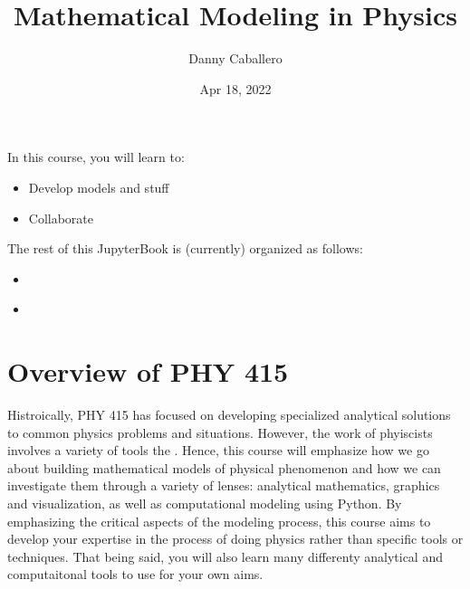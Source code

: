 \documentclass[letterpaper,10pt,english]{jupyterBook}
\title{Mathematical Modeling in Physics}
\date{Apr 18, 2022}
\author{Danny Caballero}
\begin{document}
\pagestyle{empty}
\sphinxmaketitle
\pagestyle{plain}
\sphinxtableofcontents
\pagestyle{normal}
\label{\detokenize{content/intro::doc}}






\sphinxAtStartPar
In this course, you will learn to:
\begin{itemize}
\item {} 
\sphinxAtStartPar
Develop models and stuff

\item {} 
\sphinxAtStartPar
Collaborate

\end{itemize}

\sphinxAtStartPar
The rest of this JupyterBook is (currently) organized as follows:
\begin{itemize}
\item {} 
\sphinxAtStartPar
{\hyperref[\detokenize{content/0_course/syllabus::doc}]{}}

\item {} 
\sphinxAtStartPar
{\hyperref[\detokenize{content/1_modeling/what_is_modeling::doc}]{}}

\end{itemize}


\chapter{Overview of PHY 415}
\label{\detokenize{content/0_course/syllabus:overview-of-phy-415}}\label{\detokenize{content/0_course/syllabus::doc}}
\sphinxAtStartPar
Histroically, PHY 415 has focused on developing specialized analytical solutions to common physics problems and situations. However, the work of phyiscists involves a variety of tools the . Hence, this course will emphasize how we go about building mathematical models of physical phenomenon and how we can investigate them through a variety of lenses: analytical mathematics, graphics and visualization, as well as computational modeling using Python. By emphasizing the critical aspects of the modeling process, this course aims to develop your expertise in the process of doing physics rather than specific tools or techniques. That being said, you will also learn many differenty analytical and computaitonal tools to use for your own aims.
\end{document}
